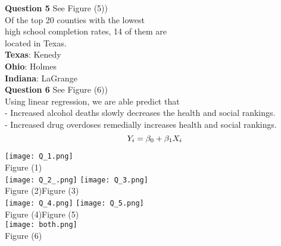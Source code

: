 \documentclass[a0paper, twocolumn, landscape]{baposter}
\begin{document}
\begin{poster}
{\begin{multicols}{2}
\textbf{Question 5} \small{See Figure (5))}\\
Of the top 20 counties with the lowest\\
high school completion rates, 14 of them are\\
located in Texas.\\
\textbf{Texas}: Kenedy\\
\textbf{Ohio}: Holmes\\
\textbf{Indiana}: LaGrange\\

\textbf{Question 6} \small{See Figure (6))}\\
Using linear regression, we are able predict
that\\
- Increased alcohol deaths slowly decreases
  the health and social rankings.\\
- Increased drug overdoses remedially increases
  health and social rankings.\\
\large\begin{equation}
\boldmath{
Y_i = \beta_0 + \beta_1 X_i}
\end{equation}
\vspace{.000001cm} %
\columnbreak

\texttt{[image: Q\_1.png]}\\
Figure (1)\\
\texttt{[image: Q\_2\_.png]}
\texttt{[image: Q\_3.png]}\\
Figure (2)\hspace{25mm}Figure (3)\\
\texttt{[image: Q\_4.png]} 
\texttt{[image: Q\_5.png]}\\
Figure (4)\hspace{25mm}Figure (5)\\
\texttt{[image: both.png]}\\
Figure (6)\\


\end{multicols}




}




\end{poster}
\end{document}
